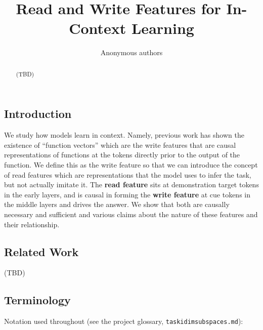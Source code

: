 \documentclass{article}
\title{Read and Write Features for In-Context Learning}
\author{Anonymous authors}
\renewcommand{\_}{\textunderscore\allowbreak}
\begin{document}
\maketitle
\begin{abstract}
(TBD)
\end{abstract}
\subsection{Introduction}\label{introduction}

We study how models learn in context. Namely, previous work has shown the existence of ``function vectors'' which are the write features that are causal representations of functions at the tokens directly prior to the output of the function. We define this as the write feature so that we can introduce the concept of read features which are representations that the model uses to infer the task, but not actually imitate it. The \textbf{read feature} sits at demonstration target tokens in the early layers, and is causal in forming the \textbf{write feature} at cue tokens in the middle layers and drives the answer. We show that both are causally necessary and sufficient and various claims about the nature of these features and their relationship.

\subsection{Related Work}\label{related-work}

(TBD)

\subsection{Terminology}\label{terminology}

Notation used throughout (see the project glossary, \texttt{task\_id\_im\_subspaces.md}):
\end{document}
